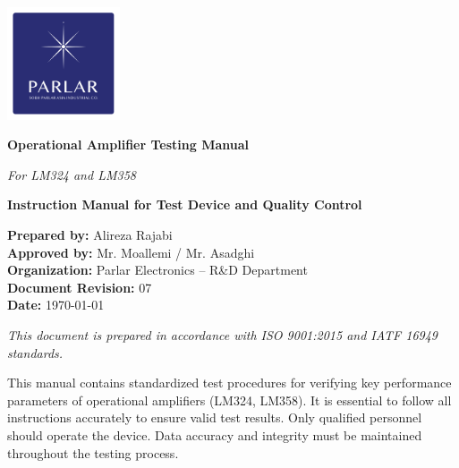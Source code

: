 \documentclass[a4paper,12pt]{article}
\begin{document}
\begin{titlepage}
    \centering

    \includegraphics[width=0.25\textwidth]{IMAGEs/Parlar-logo.png}\par\vspace{1.5cm}
    
    \vspace*{3cm}
    
    {\Huge\bfseries Operational Amplifier Testing Manual \par}
    \vspace{0.5cm}
    {\Large\itshape For LM324 and LM358\par}
    
    \vspace{1.5cm}
    
    {\Large\textbf{Instruction Manual for Test Device and Quality Control}\par}
    
    \vspace{2cm}
    
    \begin{flushleft}
    \textbf{Prepared by:} Alireza Rajabi\\
    \textbf{Approved by:} Mr. Moallemi / Mr. Asadghi\\
    \textbf{Organization:} Parlar Electronics – R\&D Department\\
    \textbf{Document Revision:} 07\\
    \textbf{Date:} \today
    \end{flushleft}
    
    \vfill
    
    \begin{center}
        \textit{This document is prepared in accordance with ISO 9001:2015 and IATF 16949 standards.}
    \end{center}
\end{titlepage}

\begin{tcolorbox}[colback=red!5!white, colframe=red!75!black, title=Important Notice]
This manual contains standardized test procedures for verifying key performance parameters of operational amplifiers (LM324, LM358). 
It is essential to follow all instructions accurately to ensure valid test results. Only qualified personnel should operate the device. 
Data accuracy and integrity must be maintained throughout the testing process.
\end{tcolorbox}
\end{document}
